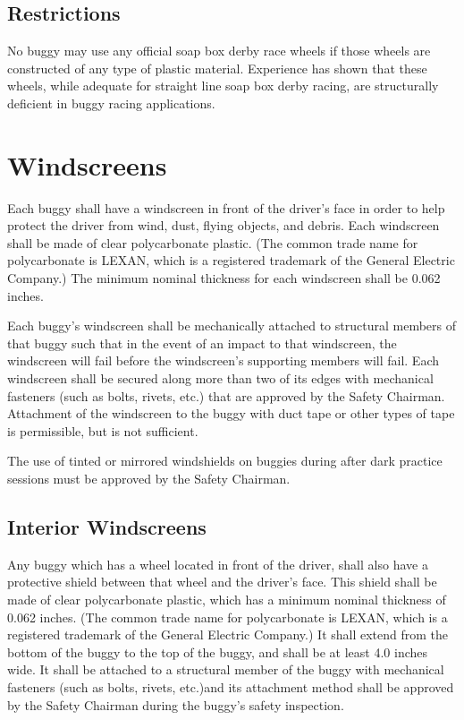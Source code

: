 \subsection{Restrictions}

	No buggy may use any official soap box derby race wheels if those wheels are
	constructed of any type of plastic material. Experience has shown that these
	wheels, while adequate for straight line soap box derby racing, are
	structurally deficient in buggy racing applications.

\section{Windscreens}

	Each buggy shall have a windscreen in front of the driver's face in order to
	help protect the driver from wind, dust, flying objects, and debris. Each
	windscreen shall be made of clear polycarbonate plastic. (The common trade name
	for polycarbonate is LEXAN, which is a registered trademark of the General
	Electric Company.) The minimum nominal thickness for each windscreen shall be
	0.062 inches.

	Each buggy's windscreen shall be mechanically attached to structural members of
	that buggy such that in the event of an impact to that windscreen, the
	windscreen will fail before the windscreen's supporting members will fail. Each
	windscreen shall be secured along more than two of its edges with mechanical
	fasteners (such as bolts, rivets, etc.) that are approved by the Safety
	Chairman. Attachment of the windscreen to the buggy with duct tape or other
	types of tape is permissible, but is not sufficient.

	The use of tinted or mirrored windshields on buggies during after dark practice
	sessions must be approved by the Safety Chairman.

\subsection{Interior Windscreens}

	Any buggy which has a wheel located in front of the driver, shall also have a
	protective shield between that wheel and the driver's face. This shield shall
	be made of clear polycarbonate plastic, which has a minimum nominal thickness
	of 0.062 inches. (The common trade name for polycarbonate is LEXAN, which is a
	registered trademark of the General Electric Company.) It shall extend from the
	bottom of the buggy to the top of the buggy, and shall be at least 4.0 inches
	wide. It shall be attached to a structural member of the buggy with mechanical
	fasteners (such as bolts, rivets, etc.)and its attachment method shall be
	approved by the Safety Chairman during the buggy's safety inspection.


